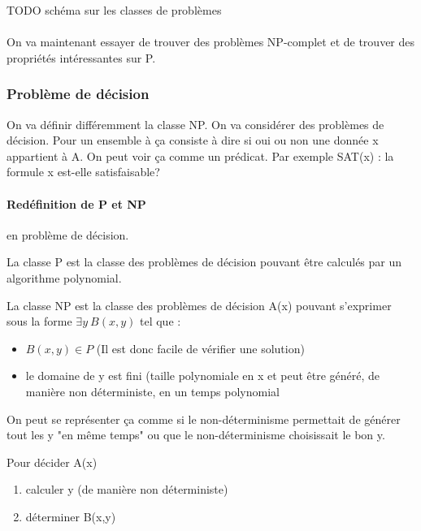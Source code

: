 TODO schéma sur les classes de problèmes

\paragraph{} On va maintenant essayer de trouver des problèmes NP-complet et de
trouver des propriétés intéressantes sur P.

\subsubsection{Problème de décision}
On va définir différemment la classe NP. On va considérer des problèmes de
décision. Pour un ensemble à ça consiste à dire si oui ou non une donnée x
appartient à A. On peut voir ça comme un prédicat. Par exemple SAT(x) : la
formule x est-elle satisfaisable?

\paragraph{Redéfinition de P et NP} en problème de décision.

\begin{mydef}[Classe P]
	La classe P est la classe des problèmes de décision pouvant être
	calculés par un algorithme polynomial.
\end{mydef}

\begin{mydef}[Classe NP]
	La classe NP est la classe des problèmes de décision A(x) pouvant
	s'exprimer sous la forme $\exists y \ B(x,y)$ tel que :
	\begin{itemize}
		\item $B(x,y) \in P$ (Il est donc facile de vérifier une
			solution)
		\item le domaine de y est fini (taille polynomiale en x
		       	et peut être généré, de manière non déterministe, en 
			un temps polynomial
	\end{itemize}
\end{mydef}

\begin{myrem}
	On peut se représenter ça comme si le non-déterminisme permettait
       	de générer tout les y "en même temps" ou 
	que le non-déterminisme choisissait le bon y.
\end{myrem}

\begin{mydef}
	Pour décider A(x)
	\begin{enumerate}
		\item calculer y (de manière non déterministe)
		\item déterminer B(x,y)
	\end{enumerate}
\end{mydef}

